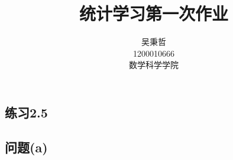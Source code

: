 \documentclass{ctexart}
\author{吴秉哲\\1200010666\\数学科学学院}
\title{统计学习第一次作业}
\begin{document}
\begin{spacing}{1.2}
    \maketitle
    \section{练习2.5}
    \subsection{问题(a)}
\end{spacing}
\end{document}
